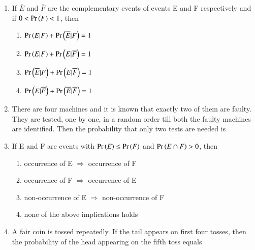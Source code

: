 \documentclass[journal,12pt,twocolumn,article]{IEEEtran}
\theoremstyle{remark}
\begin{document}
\begin{enumerate}[start = 3]
\begin{enumerate}
\begin{multicols}{4}
\end{multicols} 
\end{enumerate}
\item If $\overline{E}$ and $\overline{F}$ are the complementary events of events E and F respectively and if $0<\Pr\left(F\right)<1$, then
\hfill{}
\begin{enumerate}
\item $\Pr\left(E|F\right)+\Pr\left(\overline{E}|F\right)=1$
\item $\Pr\left(E|F\right)+\Pr\left(E|\overline{F}\right)=1$
\item $\Pr\left(\overline{E}|F\right)+\Pr\left(E|\overline{F}\right)=1$
\item $\Pr\left(E|\overline{F}\right)+\Pr\left(\overline{E}|\overline{F}\right)=1$
\end{enumerate}
\item There are four machines and it is known that exactly two of them are faulty. They are tested, one by one, in a random order till both the faulty machines are identified. Then the probability that only two tests are needed is
\hfill{}
\begin{enumerate}
\end{enumerate}
\item If E and F are events with $\Pr\left(E\right) \leq \Pr\left(F\right)$ and $\Pr\left(E\cap F\right)>0$, then
\hfill{}
\begin{enumerate}
\item occurrence of E $\Rightarrow$ occurrence of F
\item occurrence of F $\Rightarrow$ occurrence of E
\item non-occurrence of E $\Rightarrow$ non-occurrence of F
\item none of the above implications holds
\end{enumerate}
\item A fair coin is tossed repeatedly. If the tail appears on first four tosses, then the probability of the head appearing on the fifth toss equals
\hfill{}
\begin{enumerate}
\end{enumerate}
\end{enumerate}
\end{document}
